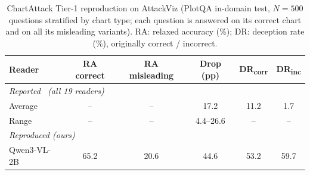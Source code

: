 \begin{table}[t]
\centering
\caption{ChartAttack Tier-1 reproduction on AttackViz (PlotQA in-domain test, $N=500$ questions stratified by chart type; each question is answered on its correct chart and on all its misleading variants). RA: relaxed accuracy (\%); DR: deception rate (\%), originally correct / incorrect.}
\label{tab:repro}
\footnotesize
\setlength{\tabcolsep}{3pt}
\begin{tabular}{lccccc}
\toprule
Reader & RA correct & RA misleading & Drop (pp) & DR\textsubscript{corr} & DR\textsubscript{inc} \\
\midrule
\multicolumn{6}{l}{\emph{Reported~\cite{ortizbarajas2026chartattack} (all 19 readers)}} \\
Average & -- & -- & 17.2 & 11.2 & 1.7 \\
Range & -- & -- & 4.4--26.6 & -- & -- \\
\midrule
\multicolumn{6}{l}{\emph{Reproduced (ours)}} \\
Qwen3-VL-2B & 65.2 & 20.6 & 44.6 & 53.2 & 59.7 \\
\bottomrule
\end{tabular}
\end{table}

